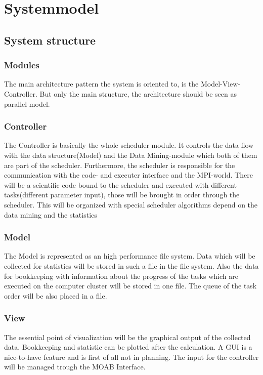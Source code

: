 \section{Systemmodel}
	\subsection{System structure}
			\subsubsection{Modules}
				The main architecture pattern the system is oriented to, is the Model-View-Controller. But 				only the main structure, the architecture should be seen as parallel model.
			\subsubsection{Controller}
				The Controller is basically the whole scheduler-module. It controls the data flow with the 				data structure(Model) and the Data Mining-module which both of them are part of the 						scheduler. Furthermore, the scheduler is responsible for the communication with the code-             				and executer interface and the MPI-world. There will be a scientific code bound to the 						scheduler and executed with different tasks(different parameter input), those will be 						brought in order through the scheduler. This will be organized with special scheduler 						algorithms depend on the data mining and the statistics
			\subsubsection{Model}
				The Model is represented as an high performance file system. Data which will be collected 					for statistics will be stored in such a file in the file system. Also the data for 							bookkeeping with information about the progress of the tasks which are executed on the 						computer cluster will be stored in one file. The queue of the task order will be also 						placed in a file. 
			\subsubsection{View}
				The essential point of visualization will be the graphical output of the collected data. 					Bookkeeping and statistic can be plotted after the calculation.
				A GUI is a nice-to-have feature and is first of all not in planning. The input for the 						controller will be managed trough the MOAB Interface.


